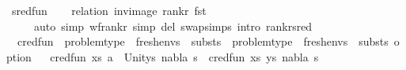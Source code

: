 \begin{isabellebody}
\begin{isamarkuptext}
\end{isamarkuptext}\isamarkuptrue%
\isamarkupfalse%
\ sred{\isacharunderscore}{\kern0pt}fun\isanewline
%
\isadelimproof
\ \ %
\endisadelimproof
%
\isatagproof
{}\isamarkupfalse%
\ {\isacharparenleft}{\kern0pt}relation\ {\isachardoublequoteopen}inv{\isacharunderscore}{\kern0pt}image\ rank{\isacharunderscore}{\kern0pt}r\ fst{\isachardoublequoteclose}{\isacharparenright}{\kern0pt}\isanewline
\ \ \ \ \ {\isacharparenleft}{\kern0pt}auto\ simp{\isacharcolon}{\kern0pt}\ wf{\isacharunderscore}{\kern0pt}rank{\isacharunderscore}{\kern0pt}r\ simp\ del{\isacharcolon}{\kern0pt}\ swap{\isachardot}{\kern0pt}simps\ intro{\isacharbang}{\kern0pt}{\isacharcolon}{\kern0pt}\ rank{\isacharunderscore}{\kern0pt}r{\isacharunderscore}{\kern0pt}sred{\isacharparenright}{\kern0pt}%
\endisatagproof
{\isafoldproof}%
%
\isadelimproof
\isanewline
%
\endisadelimproof
\isanewline
{}\isamarkupfalse%
\ \ cred{\isacharunderscore}{\kern0pt}fun\ {\isacharcolon}{\kern0pt}{\isacharcolon}{\kern0pt}\ {\isachardoublequoteopen}{\isacharparenleft}{\kern0pt}problem{\isacharunderscore}{\kern0pt}type\ {\isasymtimes}\ fresh{\isacharunderscore}{\kern0pt}envs\ {\isasymtimes}\ substs{\isacharparenright}{\kern0pt}\ {\isasymRightarrow}\ {\isacharparenleft}{\kern0pt}problem{\isacharunderscore}{\kern0pt}type\ {\isasymtimes}\ fresh{\isacharunderscore}{\kern0pt}envs\ {\isasymtimes}\ substs{\isacharparenright}{\kern0pt}\ option{\isachardoublequoteclose}\isanewline
\ \ \isanewline
{\isachardoublequoteopen}cred{\isacharunderscore}{\kern0pt}fun\ {\isacharparenleft}{\kern0pt}{\isacharparenleft}{\kern0pt}xs{\isacharcomma}{\kern0pt}\ {\isacharparenleft}{\kern0pt}a\ {\isasymsharp}{\isacharquery}{\kern0pt}\ Unit{\isacharparenright}{\kern0pt}{\isacharhash}{\kern0pt}ys{\isacharparenright}{\kern0pt}{\isacharcomma}{\kern0pt}\ nabla{\isacharcomma}{\kern0pt}\ s{\isacharparenright}{\kern0pt}\ {\isacharequal}{\kern0pt}\ cred{\isacharunderscore}{\kern0pt}fun\ {\isacharparenleft}{\kern0pt}{\isacharparenleft}{\kern0pt}xs{\isacharcomma}{\kern0pt}\ ys{\isacharparenright}{\kern0pt}{\isacharcomma}{\kern0pt}\ nabla{\isacharcomma}{\kern0pt}\ s{\isacharparenright}{\kern0pt}{\isachardoublequoteclose}\ {\isacharbar}{\kern0pt}\isanewline

\end{isabellebody}
